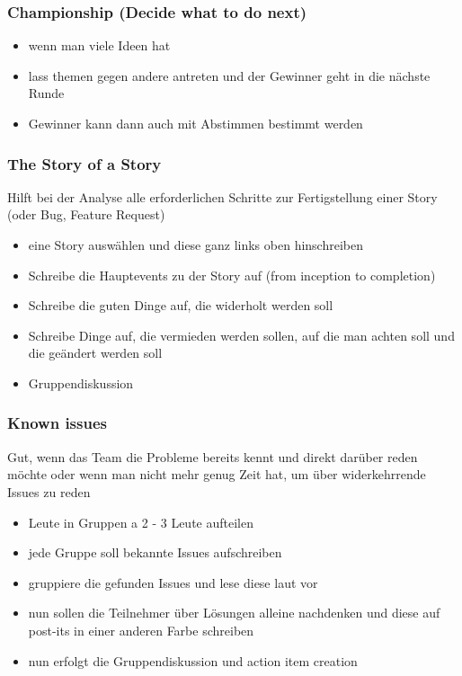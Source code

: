 \subsubsection{Championship (Decide what to do next)}

\begin{itemize}
  \item wenn man viele Ideen hat
  \item lass themen gegen andere antreten und der Gewinner geht in die nächste Runde
  \item Gewinner kann dann auch mit Abstimmen bestimmt werden
\end{itemize}


\subsubsection{The Story of a Story}
Hilft bei der Analyse alle erforderlichen Schritte zur Fertigstellung einer Story (oder Bug, Feature
Request)
\begin{itemize}
  \item eine Story auswählen und diese ganz links oben hinschreiben
  \item Schreibe die Hauptevents zu der Story auf (from inception to completion)
  \item Schreibe die guten Dinge auf, die widerholt werden soll
  \item Schreibe Dinge auf, die vermieden werden sollen, auf die man achten soll und
    die geändert werden soll
  \item Gruppendiskussion
\end{itemize}

\subsubsection{Known issues}
Gut, wenn das Team die Probleme bereits kennt und direkt darüber reden möchte oder wenn man nicht
mehr genug Zeit hat, um über widerkehrrende Issues zu reden
\begin{itemize}
  \item Leute in Gruppen a 2 - 3 Leute aufteilen
  \item jede Gruppe soll bekannte Issues aufschreiben
  \item gruppiere die gefunden Issues und lese diese laut vor
  \item nun sollen die Teilnehmer über Lösungen alleine nachdenken und diese auf post-its in einer
    anderen Farbe schreiben
  \item nun erfolgt die Gruppendiskussion und action item creation
\end{itemize}


